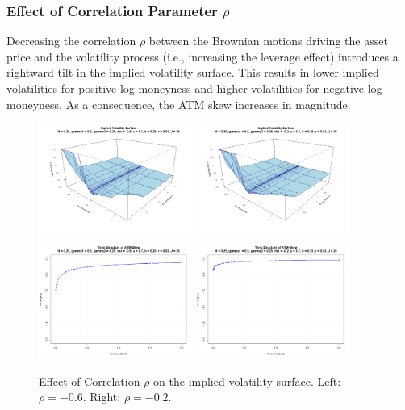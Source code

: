 \subsubsection*{Effect of Correlation Parameter $\rho$}
Decreasing the correlation $\rho$ between the Brownian motions driving the asset price and the volatility process (i.e., increasing the leverage effect) introduces a rightward tilt in the implied volatility surface. This results in lower implied volatilities for positive log-moneyness and higher volatilities for negative log-moneyness. As a consequence, the ATM skew increases in magnitude.
\begin{figure}[H]
    \centering
    \includegraphics[width=0.45\textwidth]{figures/5.2 Individual Parameter Effects/rho=-0.6_iv_surface.png}
	\includegraphics[width=0.45\textwidth]{figures/5.2 Individual Parameter Effects/rho=-0.2_iv_surface.png}
	\includegraphics[width=0.45\textwidth]{figures/5.2 Individual Parameter Effects/rho=-0.6_atm_skew.png}
	\includegraphics[width=0.45\textwidth]{figures/5.2 Individual Parameter Effects/rho=-0.2_atm_skew.png}
    \caption{Effect of Correlation $\rho$ on the implied volatility surface. Left: $\rho=-0.6$. Right: $\rho=-0.2$.}
    \label{fig:rho_effect}
\end{figure}

